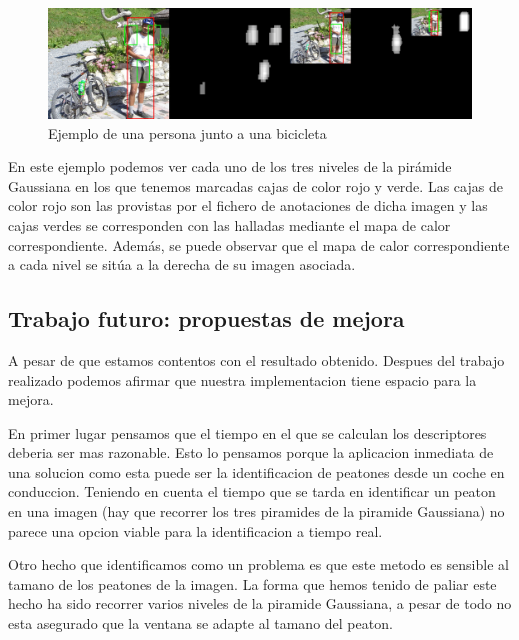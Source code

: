\documentclass[a4paper,12pt]{article}
\begin{document}
\begin{figure}
	\includegraphics[scale=0.16]{./Imagenes/test01.jpg}
	\caption{Ejemplo de una persona junto a una bicicleta}
\end{figure}

En este ejemplo podemos ver cada uno de los tres niveles de la pirámide Gaussiana en los que tenemos marcadas cajas de color rojo y verde. Las cajas de color rojo son las provistas por el fichero de anotaciones de dicha imagen y las cajas verdes se corresponden con las halladas mediante el mapa de calor correspondiente. Además, se puede observar que el mapa de calor correspondiente a cada nivel se sitúa a la derecha de su imagen asociada.






\subsection{Trabajo futuro: propuestas de mejora}

A pesar de que estamos contentos con el resultado obtenido. Despues del trabajo realizado podemos afirmar que nuestra implementacion tiene espacio para la mejora.

En primer lugar pensamos que el tiempo en el que se calculan los descriptores deberia ser mas razonable. Esto lo pensamos porque la aplicacion inmediata de una solucion como esta puede ser la identificacion de peatones desde un coche en conduccion. Teniendo en cuenta el tiempo que se tarda en identificar un peaton en una imagen (hay que recorrer los tres piramides de la piramide Gaussiana) no parece una opcion viable para la identificacion a tiempo real.

Otro hecho que identificamos como un problema es que este metodo es sensible al tamano de los peatones de la imagen. La forma que hemos tenido de paliar este hecho ha sido recorrer varios niveles de la piramide Gaussiana, a pesar de todo no esta asegurado que la ventana se adapte al tamano del peaton.
\end{document}
